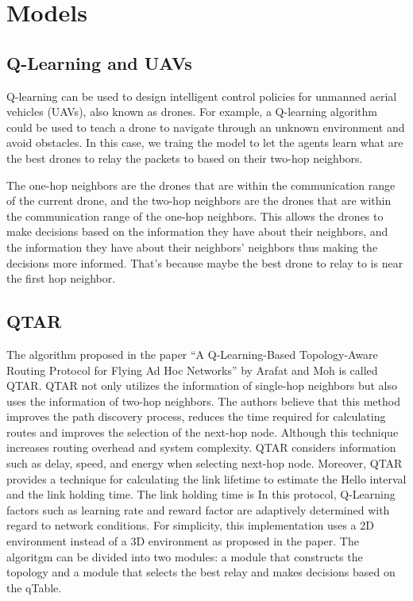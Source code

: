 \section{Models}

\subsection{Q-Learning and UAVs}
Q-learning can be used to design intelligent control policies for unmanned aerial vehicles (UAVs), also known as drones.
For example, a Q-learning algorithm could be used to teach a drone to navigate through an unknown environment and avoid obstacles.
In this case, we traing the model to let the agents learn what are the best drones to relay the packets to based on their two-hop neighbors.

The one-hop neighbors are the drones that are within the communication range of the current drone, and the two-hop neighbors are the
drones that are within the communication range of the one-hop neighbors. This allows the drones to make decisions based on the information
they have about their neighbors, and the information they have about their neighbors' neighbors thus making the decisions more informed.
That's because maybe the best drone to relay to is near the first hop neighbor.

\subsection{QTAR}
The algorithm proposed in the paper ``A Q-Learning-Based Topology-Aware Routing Protocol for Flying Ad Hoc Networks'' by Arafat and Moh is called QTAR.
QTAR not only utilizes the information of single-hop neighbors
but also uses the information of two-hop neighbors.
The authors believe that this method improves the path discovery process,
reduces the time required for calculating routes and improves the selection of the next-hop node.
Although this technique increases routing overhead and system complexity.
QTAR considers information such as delay, speed, and energy when selecting next-hop node. Moreover, QTAR provides a technique for calculating
the link lifetime to estimate the Hello interval and the link holding time. The link holding time is
In this protocol, Q-Learning factors such as learning rate and reward factor are
adaptively determined with regard to network conditions.
For simplicity, this implementation uses a 2D environment instead of a 3D environment as proposed in the paper.
The algoritgm can be divided into two modules: a module that constructs the topology and a module that selects the best relay and makes decisions based on the qTable.

